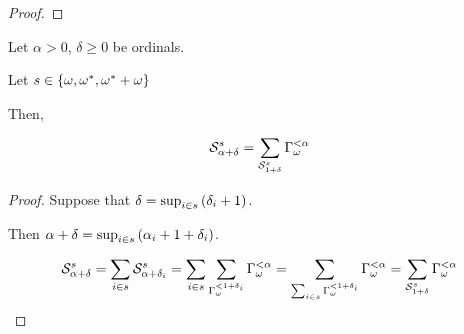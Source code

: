\begin{proof}
\end{proof}

\begin{corollary}
  Let $\alpha > 0$, $\delta \ge 0$ be ordinals.

  Let $s \in \left\{ {\omega, \omega^\ast, \omega^\ast + \omega} \right\}$

  Then,

  \[
    \mathcal{S}^{s}_{\alpha + \delta}
    = \sum_{\mathcal{S}^{s}_{1 + \delta}}{\Gamma_{\omega}^{< \alpha}}
  \]
\end{corollary}

\begin{proof}
  Suppose that $\delta = \sup_{i \in s} \left( {\delta_i + 1} \right)$.

  Then $\alpha + \delta = \sup_{i \in s} \left( {\alpha_i + 1 + \delta_i} \right)$.

  \[
    \mathcal{S}^{s}_{\alpha + \delta}
    = \sum_{i \in s}{\mathcal{S}^{s}_{\alpha + \delta_i}}
    = \sum_{i \in s}\sum_{\Gamma_{\omega}^{< 1 + \delta_i}}{\Gamma_{\omega}^{< \alpha}}
    = \sum_{\sum_{i \in s}{\Gamma_{\omega}^{< 1 + \delta_i}}}{\Gamma_{\omega}^{< \alpha}}
    = \sum_{\mathcal{S}^{s}_{1 + \delta}}{\Gamma_{\omega}^{< \alpha}}
  \]
\end{proof}
